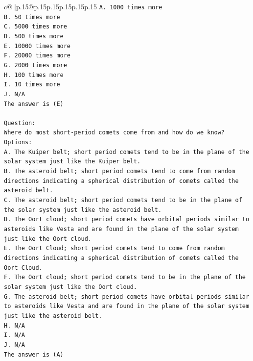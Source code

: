 \documentclass{article}
\begin{document}
{\begin{supertabular}{c@{$\;$}|p{.15\linewidth}@{}p{.15\linewidth}p{.15\linewidth}p{.15\linewidth}p{.15\linewidth}p{.15\linewidth}}
{{{\texttt{A. 1000 times more} \\
\texttt{B. 50 times more} \\
\texttt{C. 5000 times more} \\
\texttt{D. 500 times more} \\
\texttt{E. 10000 times more} \\
\texttt{F. 20000 times more} \\
\texttt{G. 2000 times more} \\
\texttt{H. 100 times more} \\
\texttt{I. 10 times more} \\
\texttt{J. N/A} \\
\texttt{The answer is (E)} \\
\\ 
\texttt{Question:} \\
\texttt{Where do most short{-}period comets come from and how do we know?} \\
\texttt{Options:} \\
\texttt{A. The Kuiper belt; short period comets tend to be in the plane of the solar system just like the Kuiper belt.} \\
\texttt{B. The asteroid belt; short period comets tend to come from random directions indicating a spherical distribution of comets called the asteroid belt.} \\
\texttt{C. The asteroid belt; short period comets tend to be in the plane of the solar system just like the asteroid belt.} \\
\texttt{D. The Oort cloud; short period comets have orbital periods similar to asteroids like Vesta and are found in the plane of the solar system just like the Oort cloud.} \\
\texttt{E. The Oort Cloud; short period comets tend to come from random directions indicating a spherical distribution of comets called the Oort Cloud.} \\
\texttt{F. The Oort cloud; short period comets tend to be in the plane of the solar system just like the Oort cloud.} \\
\texttt{G. The asteroid belt; short period comets have orbital periods similar to asteroids like Vesta and are found in the plane of the solar system just like the asteroid belt.} \\
\texttt{H. N/A} \\
\texttt{I. N/A} \\
\texttt{J. N/A} \\
\texttt{The answer is (A)} \\
}}}
\end{supertabular}}
\end{document}
